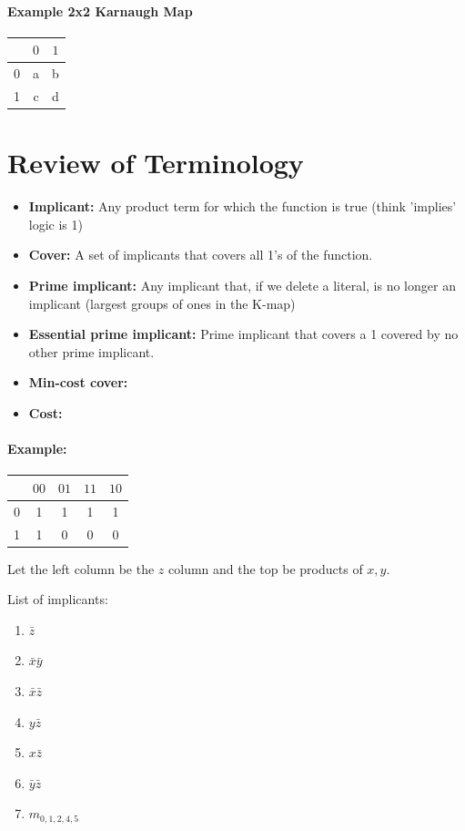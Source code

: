 \documentclass[a4paper,12pt]{report}
\begin{document}
\paragraph{Example 2x2 Karnaugh Map}
\begin{tabular}{l|cc}
& $0$ & $1$ \\
\hline
0 & a & b \\
1 & c & d \\
\end{tabular}


\section{Review of Terminology}

\begin{itemize}
\item \textbf{Implicant:} Any product term for which the function is true (think 'implies' logic is 1)
\item \textbf{Cover:} A set of implicants that covers all 1's of the function.
\item \textbf{Prime implicant:} Any implicant that, if we delete a literal, is no longer an implicant (largest
   groups of ones in the K-map)
\item \textbf{Essential prime implicant:} Prime implicant that covers a 1 covered by no other prime implicant.
\item \textbf{Min-cost cover:}
\item \textbf{Cost:}
\end{itemize}

\paragraph{Example: }
\begin{tabular}{l|cccc}
& $00$ & $01$ & $11$ & $10$   \\
\hline
0 & 1 & 1 & 1 & 1 \\
1 & 1 & 0 & 0 & 0 \\
\end{tabular}

Let the left column be the $z$ column and the top be products of $x, y$. 

List of implicants:
\begin{enumerate}
\item $\bar{z}$ 
\item $\bar{x} \bar{y}$
\item $\bar{x} \bar{z}$
\item $y\bar{z}$
\item $x\bar{z}$
\item $\bar{y}\bar{z}$
\item $m_{0, 1, 2, 4, 5}$
\end{enumerate}
\end{document}
